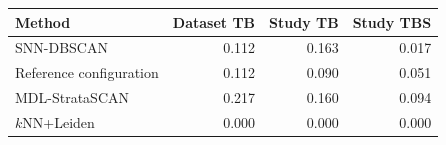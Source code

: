 \begin{tabular}{lrrr}
\toprule
Method & Dataset TB & Study TB & Study TBS \\
\midrule
SNN-DBSCAN & 0.112 & 0.163 & 0.017 \\
Reference configuration & 0.112 & 0.090 & 0.051 \\
MDL-StrataSCAN & 0.217 & 0.160 & 0.094 \\
$k$NN+Leiden & 0.000 & 0.000 & 0.000 \\
\bottomrule
\end{tabular}
